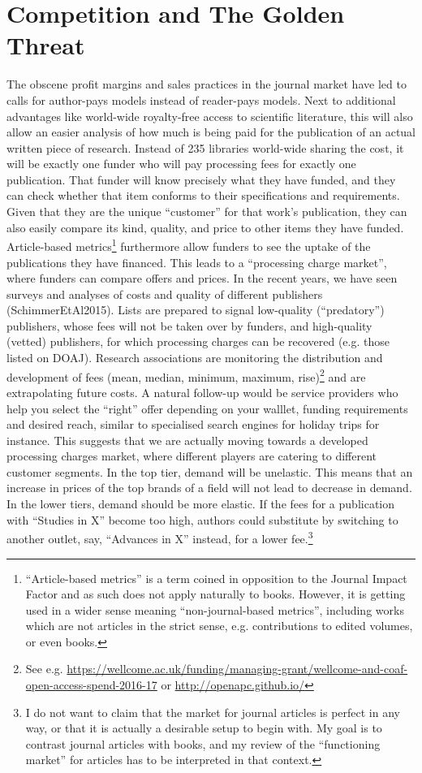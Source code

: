 \documentclass[12pt]{article}
\newcommand{\citep}[1]{(#1)}
\begin{document}
\section{Competition and The Golden Threat}\label{sec:goldenthreat}
The obscene profit margins and sales practices in the journal market have led to calls for author-pays models instead of reader-pays models. Next to additional advantages like world-wide royalty-free access to scientific literature, this will also allow an easier analysis of how much is being paid for the publication of an actual written piece of research. Instead of 235 libraries world-wide sharing the cost, it will be exactly one funder who will pay processing fees for exactly one publication. That funder will know precisely what they have funded, and they can check whether that item conforms to their specifications and requirements. Given that they are the unique ``customer'' for that work's publication, they can also easily compare its kind, quality, and price to other items they have funded. Article-based metrics\footnote{``Article-based metrics''
 is a term coined in opposition to the Journal Impact Factor and as such does not apply naturally to books. However, it is getting used in a wider sense meaning ``non-journal-based metrics'', including works which are not articles in the strict sense, e.g. contributions to edited volumes, or even books.
 } furthermore allow funders to see the uptake of the publications they have financed. This leads to a ``processing charge market'', where funders can compare offers and prices. In the recent years, we have seen surveys and analyses of costs and quality of different publishers \citep{SchimmerEtAl2015}. Lists are prepared to signal low-quality (``predatory'') publishers, whose fees will not be taken over by funders,  and high-quality (vetted) publishers, for which processing charges can be recovered (e.g. those listed on DOAJ). Research associations are monitoring the distribution and development of fees (mean, median, minimum, maximum, rise)\footnote{See e.g. \url{https://wellcome.ac.uk/funding/managing-grant/wellcome-and-coaf-open-access-spend-2016-17} or \url{http://openapc.github.io/}}
 and are extrapolating future costs. A natural follow-up would be service providers who help you select the ``right'' offer depending on your walllet, funding requirements and desired reach, similar to specialised search engines for holiday trips for instance. This suggests that we are actually moving towards a developed processing charges market, where different players are catering to different customer segments. In the top tier, demand will be unelastic. This means that an increase in prices of the top brands of a field will not lead to decrease in demand.  In the lower tiers, demand should be more elastic. If the fees for a publication with ``Studies in X'' become too high, authors could substitute by switching to another outlet, say, ``Advances in X'' instead, for a lower fee.\footnote{I do not want to claim that the market for journal articles is perfect in any way, or that it is actually a desirable setup to begin with. My goal is to contrast journal articles with books, and my review of the ``functioning market'' for articles has to be interpreted in that context.} 
 
\end{document}
